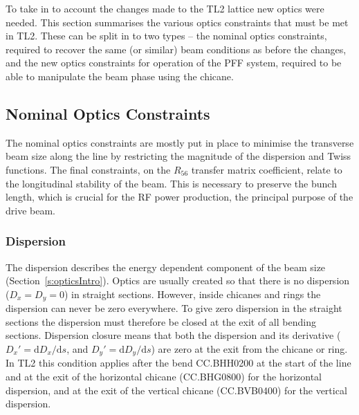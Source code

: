 
To take in to account the changes made to the TL2 lattice new optics were needed. This section summarises the various optics constraints that must be met in TL2. These can be split in to two types -- the nominal optics constraints, required to recover the same (or similar) beam conditions as before the changes, and the new optics constraints for operation of the PFF system, required to be able to manipulate the beam phase using the chicane.

\subsection{Nominal Optics Constraints}
\label{ss:nominalOpticsReqs}

The nominal optics constraints are mostly put in place to minimise the transverse beam size along the line by restricting the magnitude of the dispersion and Twiss functions. The final constraints, on the \(R_{56}\) transfer matrix coefficient, relate to the longitudinal stability of the beam. This is necessary to preserve the bunch length, which is crucial for the RF power production, the principal purpose of the drive beam.

\subsubsection{Dispersion}

The dispersion describes the energy dependent component of the beam size (Section~\ref{s:opticsIntro}). Optics are usually created so that there is no dispersion (\(D_{x} = D_{y} = 0\)) in straight sections. However, inside chicanes and rings the dispersion can never be zero everywhere. To give zero dispersion in the straight sections the dispersion must therefore be closed at the exit of all bending sections. Dispersion closure means that both the dispersion and its derivative (\(D_x' = \mathrm{d}D_x/\mathrm{d}s\), and \(D_y' = \mathrm{d}D_y/\mathrm{d}s\)) are zero at the exit from the chicane or ring. In TL2 this condition applies after the bend CC.BHH0200 at the start of the line and at the exit of the horizontal chicane (CC.BHG0800) for the horizontal dispersion, and at the exit of the vertical chicane (CC.BVB0400) for the vertical dispersion.

